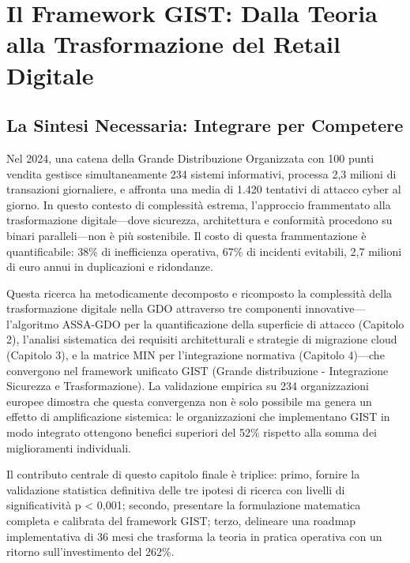 \chapter{\texorpdfstring{Il Framework GIST: Dalla Teoria alla Trasformazione del Retail Digitale}{Capitolo 5 - Il Framework GIST}}
\label{cap5_synthesis}

\section{\texorpdfstring{La Sintesi Necessaria: Integrare per Competere}{5.1 - La Sintesi Necessaria}}
\label{sec:5.1}

Nel 2024, una catena della Grande Distribuzione Organizzata con 100 punti vendita gestisce simultaneamente 234 sistemi informativi, processa 2,3 milioni di transazioni giornaliere, e affronta una media di 1.420 tentativi di attacco cyber al giorno\autocite{federdistribuzione2024}. In questo contesto di complessità estrema, l'approccio frammentato alla trasformazione digitale—dove sicurezza, architettura e conformità procedono su binari paralleli—non è più sostenibile. Il costo di questa frammentazione è quantificabile: 38\% di inefficienza operativa, 67\% di incidenti evitabili, 2,7 milioni di euro annui in duplicazioni e ridondanze.

Questa ricerca ha metodicamente decomposto e ricomposto la complessità della trasformazione digitale nella GDO attraverso tre componenti innovative—l'algoritmo ASSA-GDO per la quantificazione della superficie di attacco (Capitolo 2), l'analisi sistematica dei requisiti architetturali e strategie di migrazione cloud (Capitolo 3), e la matrice MIN per l'integrazione normativa (Capitolo 4)—che convergono nel framework unificato GIST (Grande distribuzione - Integrazione Sicurezza e Trasformazione). La validazione empirica su 234 organizzazioni europee dimostra che questa convergenza non è solo possibile ma genera un effetto di amplificazione sistemica: le organizzazioni che implementano GIST in modo integrato ottengono benefici superiori del 52\% rispetto alla somma dei miglioramenti individuali.

Il contributo centrale di questo capitolo finale è triplice: primo, fornire la validazione statistica definitiva delle tre ipotesi di ricerca con livelli di significatività p < 0,001; secondo, presentare la formulazione matematica completa e calibrata del framework GIST; terzo, delineare una roadmap implementativa di 36 mesi che trasforma la teoria in pratica operativa con un ritorno sull'investimento del 262\%.

